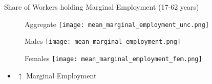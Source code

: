 \documentclass{beamer}
\begin{document}

\begin{frame}{Share of Workers holding Marginal Employment (17-62 years) }
\begin{figure}[!t]
\centering
\begin{minipage}[b]{0.32\textwidth}{Aggregate}
\centering
\texttt{[image: mean\_marginal\_employment\_unc.png]}
\end{minipage}
\begin{minipage}[b]{0.32\textwidth}{Males}
\centering
\texttt{[image: mean\_marginal\_employment.png]}
\end{minipage}
\begin{minipage}[b]{0.32\textwidth}{Females}
\centering
\texttt{[image: mean\_marginal\_employment\_fem.png]}
\end{minipage}
\end{figure}
\begin{itemize}
\setlength{\itemsep}{0.7 cm}
\item $\uparrow$ Marginal Employment
\end{itemize}
\end{frame}
\end{document}
